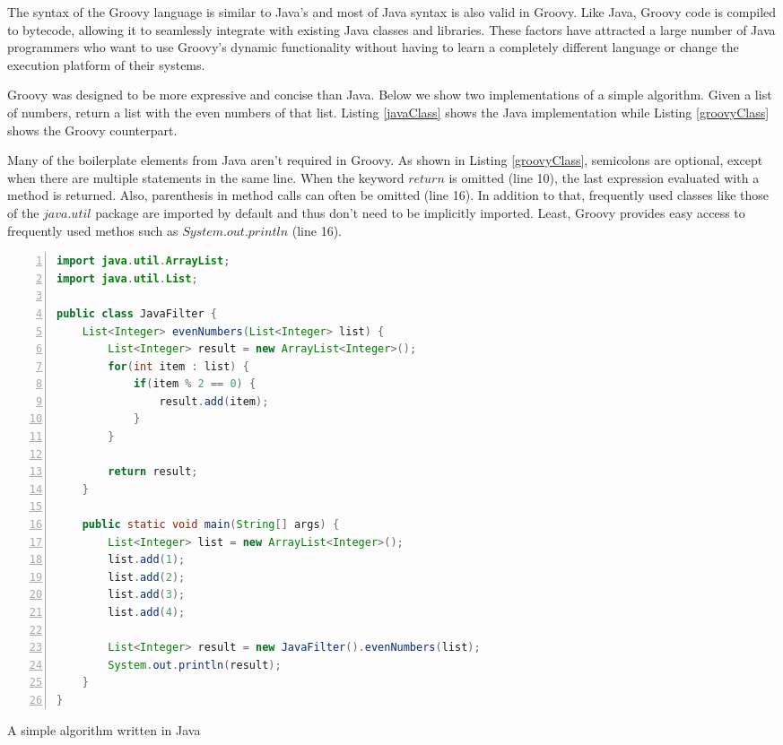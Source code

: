 \documentclass[preprint]{sigplanconf}
\begin{document}
The syntax of the Groovy language is similar to Java's and most of Java syntax is also valid in Groovy.
Like Java, Groovy code is compiled to bytecode, allowing it to seamlessly integrate with existing Java classes and libraries. 
These factors have attracted a large number of Java programmers who want to use Groovy's dynamic functionality without having to learn a completely different language or change the execution platform of their systems. 

Groovy was designed to be more expressive and concise than Java.
Below we show two implementations of a simple algorithm.
Given a list of numbers, return a list with the even numbers of that list.
Listing \ref{javaClass} shows the Java implementation while Listing \ref{groovyClass} shows the Groovy counterpart. 

Many of the boilerplate elements from Java aren't required in Groovy.  
As shown in Listing \ref{groovyClass}, semicolons are optional, except when there are multiple statements in the same line. 
When the keyword $return$ is omitted (line 10), the last expression evaluated with a method is returned. 
Also, parenthesis in method calls can often be omitted (line 16).
In addition to that, frequently used classes like those of the $java.util$ package are imported by default and thus don't need to be implicitly imported.
Least, Groovy provides easy access to frequently used methos such as $System.out.println$ (line 16).

\begin{Listing}[ht]
\begin{lstlisting}[language=Java,tabsize=2,breaklines=true,numbers=left]
import java.util.ArrayList;
import java.util.List;

public class JavaFilter {
	List<Integer> evenNumbers(List<Integer> list) {
		List<Integer> result = new ArrayList<Integer>();
		for(int item : list) {
			if(item % 2 == 0) {
				result.add(item);
			}
		}

		return result;
	}

	public static void main(String[] args) {
		List<Integer> list = new ArrayList<Integer>();
		list.add(1);
		list.add(2);
		list.add(3);
		list.add(4);

		List<Integer> result = new JavaFilter().evenNumbers(list);
		System.out.println(result);
	}
}
\end{lstlisting}
\caption{A simple algorithm written in Java}
\label{javaClass}
\end{Listing}
\end{document}
